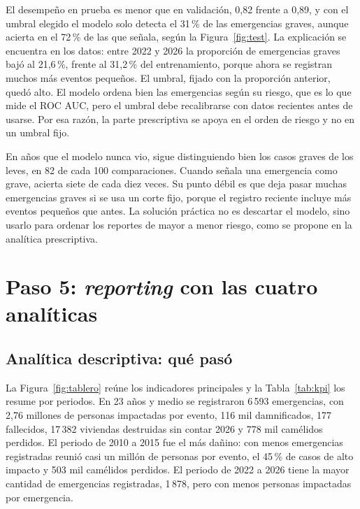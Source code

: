 \documentclass[12pt,a4paper]{article}
\begin{document}
El desempeño en prueba es menor que en validación, 0,82 frente a 0,89, y con el umbral elegido el modelo solo
detecta el 31\,\% de las emergencias graves, aunque acierta en el 72\,\% de las que señala, según la
Figura~\ref{fig:test}. La explicación se encuentra en los datos: entre 2022 y 2026 la proporción de emergencias
graves bajó al 21,6\,\%, frente al 31,2\,\% del entrenamiento, porque ahora se registran muchos más eventos
pequeños. El umbral, fijado con la proporción anterior, quedó alto. El modelo ordena bien las emergencias según su
riesgo, que es lo que mide el ROC AUC, pero el umbral debe recalibrarse con datos recientes antes de usarse. Por esa
razón, la parte prescriptiva se apoya en el orden de riesgo y no en un umbral fijo.

\begin{lectura}
En años que el modelo nunca vio, sigue distinguiendo bien los casos graves de los leves, en 82 de cada 100
comparaciones. Cuando señala una emergencia como grave, acierta siete de cada diez veces. Su punto débil es que deja
pasar muchas emergencias graves si se usa un corte fijo, porque el registro reciente incluye más eventos pequeños
que antes. La solución práctica no es descartar el modelo, sino usarlo para ordenar los reportes de mayor a menor
riesgo, como se propone en la analítica prescriptiva.
\end{lectura}

\section{Paso 5: \emph{reporting} con las cuatro analíticas}\label{sec:reporting}

\subsection{Analítica descriptiva: qué pasó}

La Figura~\ref{fig:tablero} reúne los indicadores principales y la Tabla~\ref{tab:kpi} los resume por periodos. En
23 años y medio se registraron 6\,593 emergencias, con 2,76 millones de personas impactadas por evento, 116 mil
damnificados, 177 fallecidos, 17\,382 viviendas destruidas sin contar 2026 y 778 mil camélidos perdidos. El periodo
de 2010 a 2015 fue el más dañino: con menos emergencias registradas reunió casi un millón de personas por evento, el
45\,\% de casos de alto impacto y 503 mil camélidos perdidos. El periodo de 2022 a 2026 tiene la mayor cantidad de
emergencias registradas, 1\,878, pero con menos personas impactadas por emergencia.
\end{document}
